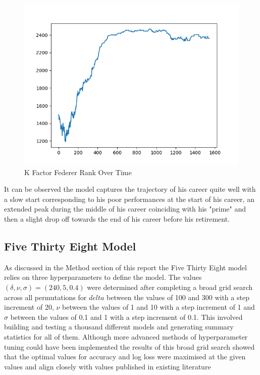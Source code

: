 \documentclass[12pt,a4paper]{article}
\begin{document}
\begin{figure}[H]
  \centering
  \includegraphics[scale=0.8]{images/federer_k_factor.png}
  \caption{K Factor Federer Rank Over Time}
  \label{fig:federer-kfactor}
\end{figure}

It can be observed the model captures the trajectory of his career quite well with a slow
start corresponding to his poor performances at the start of his career, an extended peak
during the middle of his career coinciding with his "prime" and then a slight drop off
towards the end of his career before his retirement.

\subsection{Five Thirty Eight Model}
As discussed in the Method section of this report the Five Thirty Eight model relies on
three hyperparameters to define the model. The values $(\delta,\nu,\sigma) = (240,5,0.4)$
were determined after completing a broad grid search across all permutations for $delta$
between the values of 100 and 300 with a step increment of 20, $\nu$ between the values of
1 and 10 with a step increment of 1 and $\sigma$ between the values of 0.1 and 1 with a
step increment of 0.1. This involved building and testing a thousand different models
and generating summary statistics for all of them. Although more advanced methods of
hyperparameter tuning could have been implemented the results of this broad grid search
showed that the optimal values for accuracy and log loss were maximised at the given values
and align closely with values published in existing literature \cite{kovalchik_searching_2016}
\end{document}
